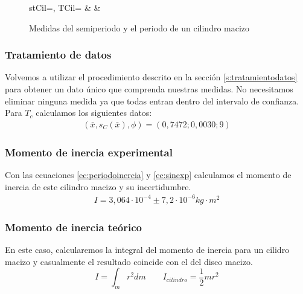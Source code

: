 \documentclass[12pt, a4paper, titlepage]{article}
\begin{document}
  \begin{figure}[H]
    \begin{table}[H]
      \centering
        {stCil=\semiperiodo, TCil=\periodo}
        {\thecsvrow & \semiperiodo & \periodo}
    \end{table}
    \caption{Medidas del semiperiodo y el periodo de un cilindro macizo}
  \end{figure}

  \subsubsection{Tratamiento de datos}

  Volvemos a utilizar el procedimiento descrito en la sección \ref{s:tratamientodatos} para obtener un dato único que comprenda nuestras medidas. No necesitamos eliminar ninguna medida ya que todas entran dentro del intervalo de confianza. Para $T_c$ calculamos los siguientes datos:
  \begin{gather*}
    (\bar{x}, s_C(\bar{x}), \phi) = (0,7472;0,0030;9)
  \end{gather*}

  \subsubsection{Momento de inercia experimental}

  Con las ecuaciones \ref{ec:periodoinercia} y \ref{ec:sinexp} calculamos el momento de inercia de este cilindro macizo y su incertidumbre.
  \begin{gather*}
    I = 3,064 \cdot 10^{-4} \pm 7,2 \cdot 10^{-6} kg \cdot m^2
  \end{gather*}

  \subsubsection{Momento de inercia teórico}

  En este caso, calcularemos la integral del momento de inercia para un cilidro macizo y casualmente el resultado coincide con el del disco macizo.
  \begin{equation}
    I = \int_m{r^2 dm} \qquad I_{cilindro} = \frac{1}{2} m r^2
  \end{equation}
\end{document}

